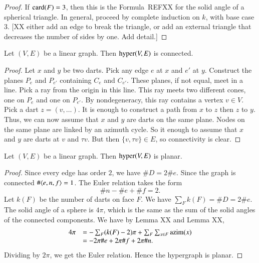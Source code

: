 \begin{proof} If ${\operatorname{card}}(F)=3$, then this is the Formula~REFXX for the solid
angle of a spherical triangle.  In general, proceed by complete
induction on $k$, with base case $3$.  [XX either add an edge to
break the triangle, or add an external triangle that decreases the
number of sides by one.  Add detail.]
\end{proof}

\begin{lemma} Let $(V,E)$ be a linear graph.  Then ${\operatorname{hyper}}(V,E)$
is connected.
\end{lemma}

\begin{proof}  Let $x$ and $y$ be two darts.  Pick any edge $e$ at
$x$ and $e'$ at $y$.  Construct the planes $P_e$ and $P_{e'}$
containing $C_e$ and $C_{e'}$.  These planes, if not equal, meet in
a line.  Pick a ray from the origin in this line.  This ray meets
two different cones, one on $P_e$ and one on $P_{e'}$.  By
nondegeneracy, this ray contains a vertex $v\in V$.  Pick a dart $z
= (v,\ldots)$.  It is enough to construct a path from $x$ to $z$
then $z$ to $y$.  Thus, we can now assume that $x$ and $y$ are darts
on the same plane.  Nodes on the same plane are linked by an azimuth
cycle.  So it enough to assume that $x$ and $y$ are darts at $v$ and
$\tau v$.  But then $\{v,\tau v\}\in E$, so connectivity is clear.
\end{proof}

\begin{lemma} Let $(V,E)$ be a linear graph.  Then ${\operatorname{hyper}}(V,E)$
is planar.
\end{lemma}

\begin{proof}  Since every edge has order $2$, we have $\# D = 2\#
e$.  Since the graph is connected $\#\langle e,n,f\rangle = 1$.  The Euler
relation takes the form
    $$
    \# n - \# e + \# f = 2.
    $$
Let $k(F)$ be the number of darts on face $F$.  We have $\sum_F k(F)
= \# D = 2 \# e$.  The solid angle of a sphere is $4\pi$, which is
the same as the sum of the solid angles of the connected components.
We have by Lemma XX and Lemma XX,
    \begin{equation}\begin{array}{lll}
    4\pi &= - \sum_F (k(F) - 2)\pi + \sum_F \sum_{x\in
    F}{\operatorname{azim}}(x)\\
        &= - 2 \pi\# e  + 2 \pi\# f  + 2\pi\# n.
    \end{array}
    \end{equation}
Dividing by $2\pi$, we get the Euler relation.  Hence the hypergraph
is planar.
\end{proof}

